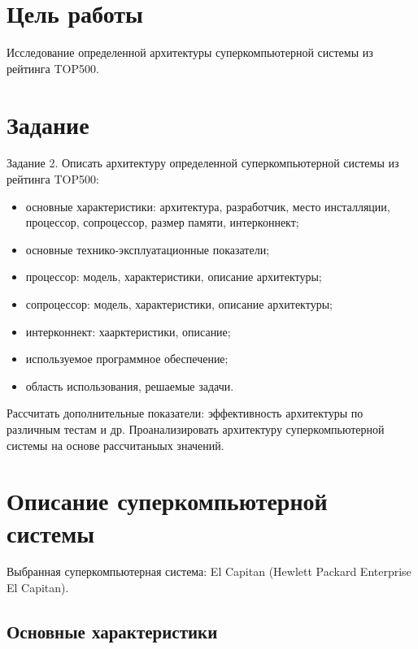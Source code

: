 \documentclass[14pt,a4paper]{extarticle}
\begin{document}
\section{Цель работы}
Исследование определенной архитектуры суперкомпьютерной системы из рейтинга TOP500.

\section{Задание}

\begin{sloppypar}
    \renewcommand{\labelitemi}{$-$}

    Задание 2. Описать архитектуру определенной суперкомпьютерной системы из рейтинга TOP500:

    \begin{itemize}
        \item основные характеристики: архитектура, разработчик, место инсталляции,
            процессор, сопроцессор, размер памяти, интерконнект;
        \item основные технико-эксплуатационные показатели;
        \item процессор: модель, характеристики, описание архитектуры;
        \item сопроцессор: модель, характеристики, описание архитектуры;
        \item интерконнект: хаарктеристики, описание;
        \item используемое программное обеспечение;
        \item область использования, решаемые задачи.
    \end{itemize}

    Рассчитать дополнительные показатели: эффективность архитектуры по различным тестам и др.
    Проанализировать архитектуру суперкомпьютерной системы на основе рассчитаныых значений.
\end{sloppypar}

\section{Описание суперкомпьютерной системы}

Выбранная суперкомпьютерная система: El Capitan (Hewlett Packard Enterprise El Capitan).

\subsection{Основные характеристики}
\end{document}
